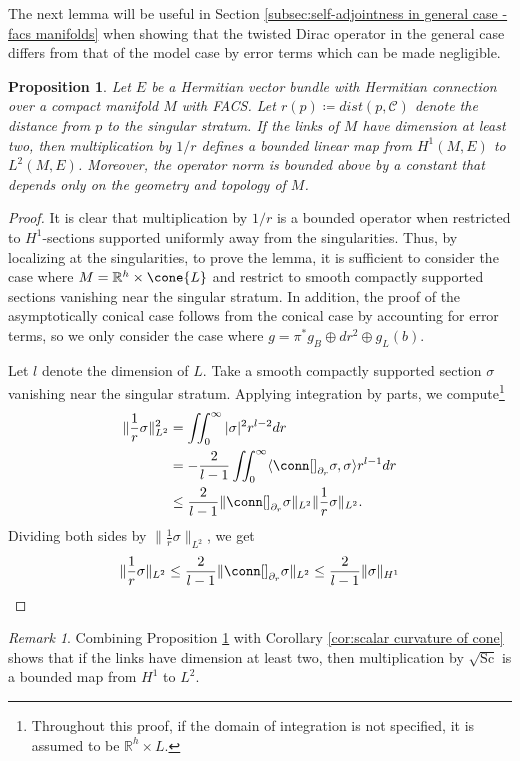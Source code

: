 \documentclass[12pt, reqno]{amsart}
\theoremstyle{plain} %
\newtheorem{proposition}[theorem]{Proposition}
\theoremstyle{definition}
\theoremstyle{remark}
\newtheorem{remark}[theorem]{Remark}
\numberwithin{equation}{section}
\newcommand{\norm}[1]{\lVert #1 \rVert}
\newcommand{\pnorm}[1]{| #1 |}
\newcommand{\cat}[1]{\mathcal{#1}}
\newcommand{\field}[1]{\mathbb{#1}}
\newcommand{\R}{\field{R}}
\newcommand{\Sc}{\mathrm{Sc}}
\newcommand{\inner}[1]{\langle #1 \rangle}
\newcommand{\hdim}{h} %
\newcommand{\ldim}{l} %
\begin{document}
The next lemma will be useful in Section \ref{subsec:self-adjointness in general case - facs manifolds} when showing that the twisted Dirac operator in the general case differs from that of the model case by error terms which can be made negligible.

\begin{proposition}\label{prop:multiplication by 1/r is bounded}
    Let \(E\) be a Hermitian vector bundle with Hermitian connection over a compact manifold \(M\) with FACS.
    Let \(r(p) \coloneqq dist(p, \cat{C})\) denote the distance from \(p\) to the singular stratum.
    If the links of \(M\) have dimension at least two, then multiplication by \(1/r\) defines a bounded linear map from \(H^1(M, E)\) to \(L^2(M, E)\).
    Moreover, the operator norm is bounded above by a constant that depends only on the geometry and topology of \(M\).
\end{proposition}
\begin{proof}
    It is clear that multiplication by \(1/r\) is a bounded operator when restricted to \(H^1\)-sections supported uniformly away from the singularities.
    Thus, by localizing at the singularities, to prove the lemma, it is sufficient to consider the case where \(M = \R^\hdim \times \cone{L}\) and restrict to smooth compactly supported sections vanishing near the singular stratum.
    In addition, the proof of the asymptotically conical case follows from the conical case by accounting for error terms, so we only consider the case where \(g = \pi^*g_B \oplus dr^2 \oplus g_L(b)\).

    Let \(\ldim\) denote the dimension of \(L\).
    Take a smooth compactly supported section \(\sigma\) vanishing near the singular stratum.
    Applying integration by parts, we compute\footnote{Throughout this proof, if the domain of integration is not specified, it is assumed to be \(\R^\hdim \times L\).}
    \begin{align*}
        \norm{\frac{1}{r} \sigma}_{L^2}^2 &= \iint_{0}^{\infty} \pnorm{\sigma}^2 r^{\ldim-2} dr \\
        &= -\frac{2}{\ldim-1} \iint_{0}^{\infty} \inner{\conn[]_{\partial_r} \sigma, \sigma} r^{\ldim-1}dr \\
        &\leq \frac{2}{\ldim-1} \norm{\conn[]_{\partial_r} \sigma}_{L^2} \norm{\frac{1}{r} \sigma}_{L^2}.
    \end{align*}
    Dividing both sides by \(\norm{\frac{1}{r} \sigma}_{L^2}\), we get
    \begin{equation*}
        \norm{\frac{1}{r} \sigma}_{L^2} \leq \frac{2}{\ldim-1} \norm{\conn[]_{\partial_r} \sigma}_{L^2} \leq \frac{2}{\ldim-1} \norm{\sigma}_{H^1}
    \end{equation*}
\end{proof}
\begin{remark}\label{rem:multiplication with scalar curvature is a bounded map}
    Combining Proposition \ref{prop:multiplication by 1/r is bounded} with Corollary \ref{cor:scalar curvature of cone} shows that if the links have dimension at least two, then multiplication by \(\sqrt{\Sc}\) is a bounded map from \(H^1\) to \(L^2\).
\end{remark}
\end{document}
